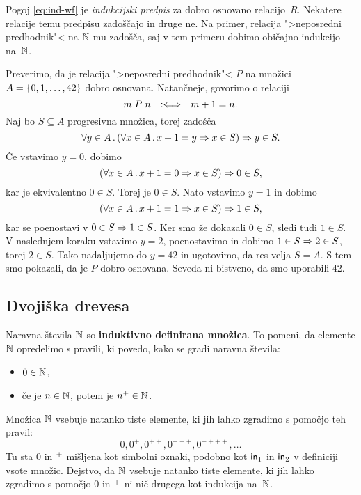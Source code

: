 Pogoj \eqref{eq:ind-wf} je \emph{indukcijski predpis} za dobro osnovano relacijo~$R$. Nekatere relacije temu predpisu zadoščajo in druge ne. Na primer, relacija ">neposredni predhodnik"< na $\mathbb{N}$ mu zadošča, saj v tem primeru dobimo običajno indukcijo na~$\mathbb{N}$.

\begin{primer}
  Preverimo, da je relacija ">neposredni predhodnik"< $P$ na množici $A = \left\{0, 1, \ldots, 42\right\}$ dobro osnovana.
  Natančneje, govorimo o relaciji
  \begin{equation*}
    m \mathrel{P} n \quad {{:}{\Longleftrightarrow}}\quad m + 1 = n.
  \end{equation*}
  Naj bo $S \subseteq A$ progresivna množica, torej zadošča
  \begin{equation*}
    \forall y \in A \,.\, (\forall x \in A \,.\, x + 1 = y \Rightarrow x \in S) \Rightarrow y \in S.
  \end{equation*}
  Če vstavimo $y = 0$, dobimo
  \begin{equation*}
    (\forall x \in A \,.\, x + 1 = 0 \Rightarrow x \in S) \Rightarrow 0 \in S,
  \end{equation*}
  kar je ekvivalentno $0 \in S$. Torej je $0 \in S$. Nato vstavimo $y = 1$ in dobimo
  \begin{equation*}
    (\forall x \in A \,.\, x + 1 = 1 \Rightarrow x \in S) \Rightarrow 1 \in S,
  \end{equation*}
  kar se poenostavi v $0 \in S \Rightarrow 1 \in S$. Ker smo že dokazali $0 \in S$, sledi tudi $1 \in S$. V naslednjem koraku vstavimo $y = 2$, poenostavimo in dobimo $1 \in S \Rightarrow 2 \in S$, torej $2 \in S$. Tako nadaljujemo do $y = 42$ in ugotovimo, da res velja $S = A$. S tem smo pokazali, da je $P$ dobro osnovana. Seveda ni bistveno, da smo uporabili $42$.
\end{primer}

\subsection{Dvojiška drevesa}

Naravna števila $\mathbb{N}$ so \textbf{induktivno definirana množica}. To pomeni, da elemente $\mathbb{N}$
opredelimo s pravili, ki povedo, kako se gradi naravna števila:
%
\begin{itemize}
\item $0 \in \mathbb{N}$,
\item če je $n \in \mathbb{N}$, potem je ${n^{+}} \in \mathbb{N}$.
\end{itemize}
%
Množica $\mathbb{N}$ vsebuje natanko tiste elemente, ki jih lahko zgradimo s pomočjo teh pravil:
%
\begin{equation*}
    0, 0^{+}, 0^{++}, 0^{+++}, 0^{++++}, \ldots
\end{equation*}
%
Tu sta $0$ in ${{}^{+}}$ mišljena kot simbolni oznaki, podobno kot $\mathsf{in}_{1}$ in $\mathsf{in}_{2}$ v definiciji vsote množic. Dejstvo,
da $\mathbb{N}$ vsebuje natanko tiste elemente, ki jih lahko zgradimo s pomočjo $0$ in ${{}^{+}}$ ni nič drugega kot indukcija
na~$\mathbb{N}$.

